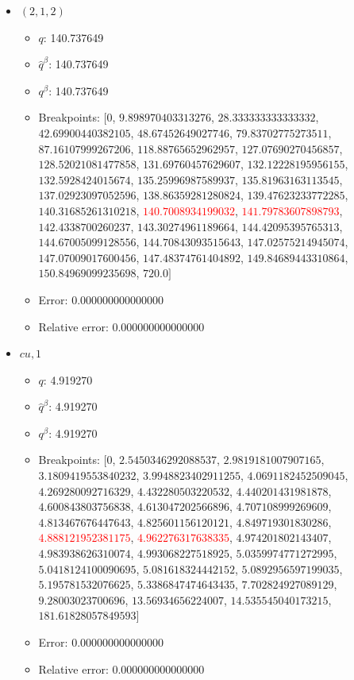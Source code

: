 \documentclass{article}%
\begin{document}
\begin{itemize}
\begin{itemize}
		\item Relative error: 0.000000000000000%
	\end{itemize}%
	\item $(2, 1, 2)$%
	\begin{itemize}%
		\item $q$: 140.737649%
		\item $\hat{q}^\beta$: 140.737649%
		\item $q^\beta$: 140.737649%
		\item Breakpoints: $[$$0$, $9.898970403313276$, $28.333333333333332$, $42.69900440382105$, $48.67452649027746$, $79.83702775273511$, $87.16107999267206$, $118.88765652962957$, $127.07690270456857$, $128.52021081477858$, $131.69760457629607$, $132.12228195956155$, $132.5928424015674$, $135.25996987589937$, $135.81963163113545$, $137.02923097052596$, $138.86359281280824$, $139.47623233772285$, $140.31685261310218$, \textcolor{red}{$140.7008934199032$}, \textcolor{red}{$141.79783607898793$}, $142.4338700260237$, $143.30274961189664$, $144.42095395765313$, $144.67005099128556$, $144.70843093515643$, $147.02575214945074$, $147.07009017600456$, $147.48374761404892$, $149.84689443310864$, $150.84969099235698$, $720.0$$]$%
		\item Error: 0.000000000000000%
		\item Relative error: 0.000000000000000%
	\end{itemize}%
	\item $\textit{cu},1$%
	\begin{itemize}%
		\item $q$: 4.919270%
		\item $\hat{q}^\beta$: 4.919270%
		\item $q^\beta$: 4.919270%
		\item Breakpoints: $[$$0$, $2.5450346292088537$, $2.9819181007907165$, $3.1809419553840232$, $3.9948823402911255$, $4.0691182452509045$, $4.269280092716329$, $4.432280503220532$, $4.440201431981878$, $4.600843803756838$, $4.613047202566896$, $4.707108999269609$, $4.813467676447643$, $4.825601156120121$, $4.849719301830286$, \textcolor{red}{$4.888121952381175$}, \textcolor{red}{$4.962276317638335$}, $4.974201802143407$, $4.983938626310074$, $4.993068227518925$, $5.0359974771272995$, $5.0418124100090695$, $5.081618324442152$, $5.0892956597199035$, $5.195781532076625$, $5.3386847474643435$, $7.702824927089129$, $9.28003023700696$, $13.56934656224007$, $14.535545040173215$, $181.61828057849593$$]$%
		\item Error: 0.000000000000000%
		\item Relative error: 0.000000000000000%

\end{itemize}
\end{itemize}
\end{document}
